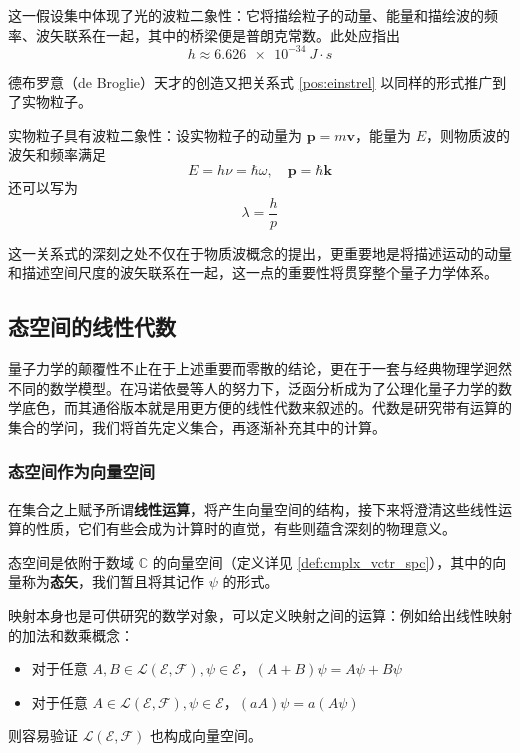 \documentclass[cn,10pt,math=newtx,citestyle=gb7714-2015,bibstyle=gb7714-2015]{elegantbook}
\def\bm{\boldsymbol}
\def\ms{\mathscr}
\def\mc{\mathcal}
\def\C{\mathbb C}
\begin{document}
这一假设集中体现了光的波粒二象性：它将描绘粒子的动量、能量和描绘波的频率、波矢联系在一起，其中的桥梁便是普朗克常数。此处应指出
\begin{equation*}
   h \approx \SI{6.626e-34}{J\cdot s}
\end{equation*}

德布罗意（de Broglie）天才的创造又把关系式 \ref{pos:einstrel} 以同样的形式推广到了实物粒子。
\begin{postulate}[德布罗意关系]\label{pos:debrel} 
   实物粒子具有波粒二象性：设实物粒子的动量为 $\bm p=m\bm v$，能量为 $E$，则物质波的波矢和频率满足
   \begin{equation}
      E = h\nu = \hbar\omega,\quad \bm p=\hbar\bm k
   \end{equation}
   还可以写为
   \begin{equation}
      \lambda = \frac h p
   \end{equation}
   
\end{postulate}

这一关系式的深刻之处不仅在于物质波概念的提出，更重要地是将描述运动的动量和描述空间尺度的波矢联系在一起，这一点的重要性将贯穿整个量子力学体系。

\subsection{态空间的线性代数}
量子力学的颠覆性不止在于上述重要而零散的结论，更在于一套与经典物理学迥然不同的数学模型。在冯诺依曼等人的努力下，泛函分析成为了公理化量子力学的数学底色，而其通俗版本就是用更方便的线性代数来叙述的。代数是研究带有运算的集合的学问，我们将首先定义集合，再逐渐补充其中的计算。

\subsubsection{态空间作为向量空间}

在集合之上赋予所谓\textbf{线性运算}，将产生向量空间的结构，接下来将澄清这些线性运算的性质，它们有些会成为计算时的直觉，有些则蕴含深刻的物理意义。

\begin{definition}[态空间中的态矢]\label{def:statespace}
   态空间是依附于数域 $\C$ 的向量空间（定义详见 \ref{def:cmplx_vctr_spc}），其中的向量称为\textbf{态矢}，我们暂且将其记作 $\psi$ 的形式。
\end{definition}

映射本身也是可供研究的数学对象，可以定义映射之间的运算：例如给出线性映射的加法和数乘概念：
\begin{itemize}
    \item 对于任意 $A, B\in\mc L(\ms E,\mc F),\psi\in\ms E$，$(A+B)\psi=A\psi+B\psi$
    \item 对于任意 $A\in\mc L(\ms E,\mc F),\psi\in\ms E$，$(aA)\psi=a(A\psi)$
\end{itemize}
则容易验证 $\mc L(\ms E,\mc F)$ 也构成向量空间。
\end{document}
